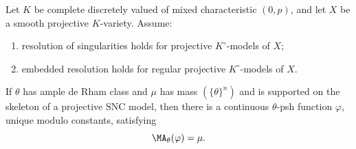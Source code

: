 \begin{theorem}\label{thm:fgk-mixed-characteristic-cy}
Let $K$ be complete discretely valued of mixed characteristic $(0,p)$,
and let $X$ be a smooth projective $K$-variety.  Assume:
\begin{enumerate}
\item resolution of singularities holds for projective
      $K^\circ$-models of $X$;
\item embedded resolution holds for regular projective
      $K^\circ$-models of $X$.
\end{enumerate}
If $\theta$ has ample de Rham class and $\mu$ has mass
$(\{\theta\}^n)$ and is supported on the skeleton of a projective SNC
model, then there is a continuous $\theta$-psh function $\varphi$,
unique modulo constants, satisfying
\[
                         \MA_\theta(\varphi)=\mu.
\]
\end{theorem}
